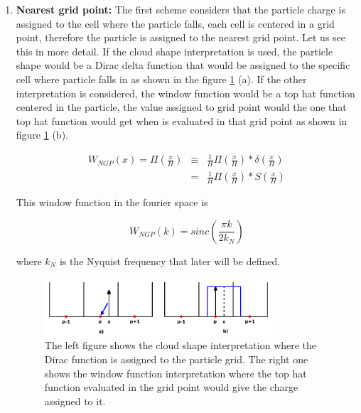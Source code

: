 \begin{enumerate}

\item \textbf{ Nearest grid point:} The first scheme considers that the particle charge is 
assigned to the cell where the particle falls, each cell is centered 
in a grid point, therefore the particle is assigned to the nearest grid point. 
Let us see this in more detail. If the cloud shape interpretation is used, the particle 
shape would be a Dirac delta function that would be assigned to the specific cell 
where particle falls in as shown in the figure \ref{NGP} (a). If the other interpretation 
is considered, the window function would be a top hat function centered in the particle, 
the value assigned to grid point would the one that top hat function would get when is 
evaluated in that grid point as shown in figure \ref{NGP} (b). 

\begin{eqnarray*}
 W_{NGP}(x)  =  \Pi \left( \frac{x}{H} \right) & \equiv & \frac{1}{H}\Pi\left(\frac{x}{H}\right) *\delta \left(\frac{x}{H}\right) \\ 
&  = &\frac{1}{H}\Pi\left(\frac{x}{H}\right)*S\left(\frac{x}{H}\right)
\end{eqnarray*}

This window function in the fourier space is

\[ W_{NGP}(k)= sinc\left(\frac{\pi k}{2k_N} \right)\]

where $k_N$ is the Nyquist frequency that later will be defined. 

\begin{figure}[htbp]
       \centering
               \includegraphics[width=0.8\textwidth]{Images/chapter3/NGP.png}
       \caption{\small The left figure shows the cloud shape interpretation where the Dirac function
       is assigned to the particle grid. The right one shows the window function interpretation
       where the top hat function evaluated in the grid point would give the charge assigned to it. }
       \label{NGP}
 \end{figure}


\end{enumerate}
